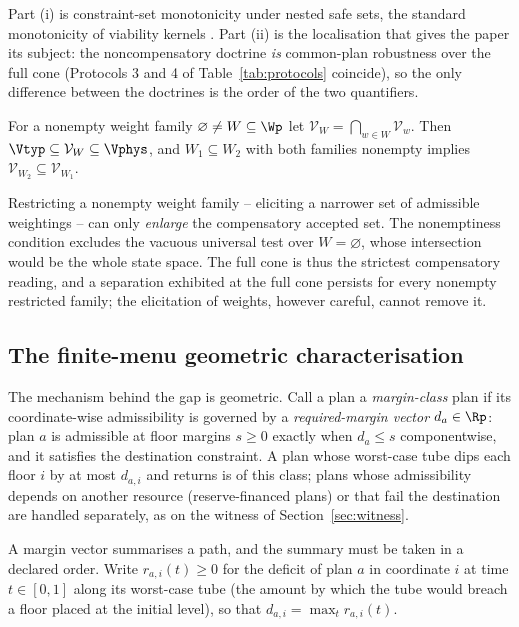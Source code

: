 Part (i) is constraint-set monotonicity under nested safe sets, the standard monotonicity of viability kernels \citep{Aubin1991,Frankowska1989}. Part (ii) is the localisation that gives the paper its subject: the noncompensatory doctrine \emph{is} common-plan robustness over the full cone (Protocols 3 and 4 of Table~\ref{tab:protocols} coincide), so the only difference between the doctrines is the order of the two quantifiers.

\begin{proposition}\label{prop:monotone}
For a nonempty weight family $\varnothing\ne W\subseteq\Wp$ let $\mathcal V_W=\bigcap_{w\in W}\mathcal V_w$. Then $\Vtyp\subseteq\mathcal V_W\subseteq\Vphys$, and $W_1\subseteq W_2$ with both families nonempty implies $\mathcal V_{W_2}\subseteq\mathcal V_{W_1}$.
\end{proposition}

Restricting a nonempty weight family -- eliciting a narrower set of admissible weightings -- can only \emph{enlarge} the compensatory accepted set. The nonemptiness condition excludes the vacuous universal test over $W=\varnothing$, whose intersection would be the whole state space. The full cone is thus the strictest compensatory reading, and a separation exhibited at the full cone persists for every nonempty restricted family; the elicitation of weights, however careful, cannot remove it.

\subsection{The finite-menu geometric characterisation}

The mechanism behind the gap is geometric. Call a plan a \emph{margin-class} plan if its coordinate-wise admissibility is governed by a \emph{required-margin vector} $d_a\in\Rp$: plan $a$ is admissible at floor margins $s\ge0$ exactly when $d_a\le s$ componentwise, and it satisfies the destination constraint. A plan whose worst-case tube dips each floor $i$ by at most $d_{a,i}$ and returns is of this class; plans whose admissibility depends on another resource (reserve-financed plans) or that fail the destination are handled separately, as on the witness of Section~\ref{sec:witness}.

A margin vector summarises a path, and the summary must be taken in a declared order. Write $r_{a,i}(t)\ge0$ for the deficit of plan $a$ in coordinate $i$ at time $t\in[0,1]$ along its worst-case tube (the amount by which the tube would breach a floor placed at the initial level), so that $d_{a,i}=\max_t r_{a,i}(t)$.

